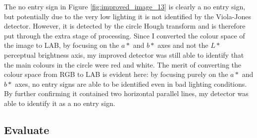\documentclass[twocolumn, 10pt, a4paper]{article}
\begin{document}
The no entry sign in Figure \ref{fig:improved_image_13} is clearly a no entry sign, but potentially due to the very low lighting it is not identified by the Viola-Jones detector.
However, it is detected by the circle Hough transform and is therefore put through the extra stage of processing.
Since I converted the colour space of the image to LAB, by focusing on the $a*$ and $b*$ axes and not the $L*$ perceptual brightness axis, my improved detector was still able to identify that the main colours in the circle were red and white.
The merit of converting the colour space from RGB to LAB is evident here: by focusing purely on the $a*$ and $b*$ axes, no entry signs are able to be identified even in bad lighting conditions.
By further confirming it contained two horizontal parallel lines, my detector was able to identify it as a no entry sign.

\subsection{Evaluate}
\end{document}
